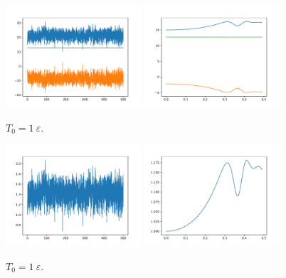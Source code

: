 \begin{figure}
    \centering
    \includegraphics[width=0.45\textwidth]{A1/build/aequi1_E.pdf}
    \includegraphics[width=0.45\textwidth]{A1/build/aequi1_EE.pdf}
    \caption{ $T_0 = 1\:\varepsilon$.}
    \label{fig:e1}
\end{figure}

\begin{figure}
    \centering
    \includegraphics[width=0.45\textwidth]{A1/build/aequi1_T.pdf}
    \includegraphics[width=0.45\textwidth]{A1/build/aequi1_TT.pdf}
    \caption{$T_\text{0} = 1\:\varepsilon$.}
    \label{fig:T1}
\end{figure}

